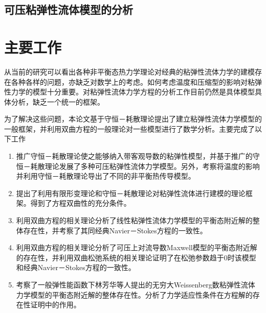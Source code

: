 \documentclass{article}
\begin{document}
\subsection{可压粘弹性流体模型的分析}


\section{主要工作}
从当前的研究可以看出各种非平衡态热力学理论对经典的粘弹性流体力学的建模存在各种各样的问题，亦缺乏对数学上的考虑。如何考虑温度和压缩型的影响对粘弹性力学的模型十分重要。对粘弹性流体力学方程的分析工作目前仍然是具体模型具体分析，缺乏一个统一的框架。

为了解决这些问题，本论文基于守恒－耗散理论提出了建立粘弹性流体力学模型的一般框架，并利用双曲方程的一般理论对一些模型进行了数学分析。主要完成了以下工作
\begin{enumerate}
\item 推广守恒－耗散理论使之能够纳入带客观导数的粘弹性模型，并基于推广的守恒－耗散理论发展了多种可压粘弹性流体力学模型。另外，考察将温度的影响并利用守恒－耗散理论导出了不同的非平衡热传导模型。
\item 提出了利用有限形变理论和守恒－耗散理论对粘弹性流体进行建模的理论框架。得到了方程双曲性的充分条件。
\item 利用双曲方程的相关理论分析了线性粘弹性流体力学模型的平衡态附近解的整体存在性，并考察了其同经典Navier－Stokes方程的一致性。
\item 利用双曲方程的相关理论分析了可压上对流导数Maxwell模型的平衡态附近解的存在性，并利用双曲松弛系统的相关理论证明了在松弛参数趋于0时该模型和经典Navier－Stokes方程的一致性。
\item 考察了一般弹性能函数下林芳华等人提出的无穷大Weissenberg数粘弹性流体力学模型的平衡态附近解的整体存在性。分析了力学适应性条件在方程解的存在性证明中的作用。
\end{enumerate}
\end{document}
